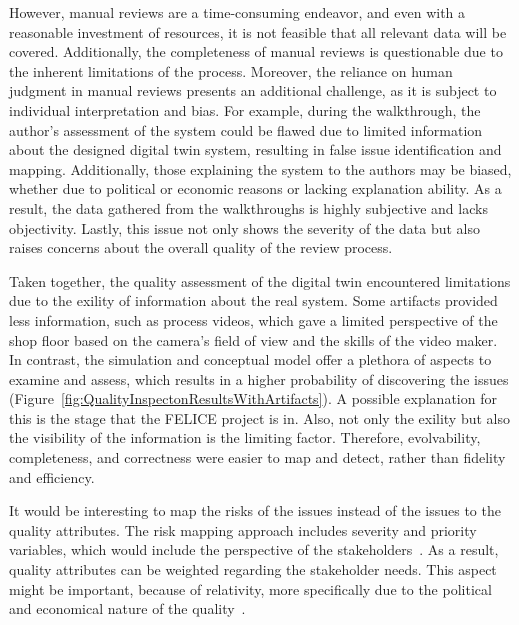 \documentclass{llncs}
\begin{document}
    However, manual reviews are a time-consuming endeavor, and even with a reasonable investment of resources, it is not feasible that all relevant data will be covered. 
    Additionally, the completeness of manual reviews is questionable due to the inherent limitations of the process. 
    Moreover, the reliance on human judgment in manual reviews presents an additional challenge, as it is subject to individual interpretation and bias.  
    For example, during the walkthrough, the author's assessment of the system could be flawed due to limited information about the designed digital twin system, resulting in false 
    issue identification and mapping. Additionally, those explaining the system to the authors may be biased, 
    whether due to political or economic reasons or lacking explanation ability. As a result, the data gathered from the walkthroughs is highly subjective and lacks objectivity. Lastly, this issue not only shows the severity of the data but also raises concerns about 
    the overall quality of the review process.

    Taken together, the quality assessment of the digital twin encountered limitations due to the exility of information about the real system. 
    Some artifacts provided less information, such as process videos, which gave a limited perspective of the shop floor based on the camera's 
    field of view and the skills of the video maker. In contrast, the simulation and conceptual model offer a plethora of aspects to examine and assess, 
    which results in a higher probability of discovering the issues (Figure~\ref{fig:QualityInspectonResultsWithArtifacts}). 
    A possible explanation for this is the stage that the FELICE project is in. Also, not only the exility but also the visibility of the information is the limiting factor. 
    Therefore, evolvability, completeness, and correctness were easier to map and detect, rather than fidelity and efficiency. 

    It would be interesting to map the risks of the issues instead of the issues to the quality attributes. 
    The risk mapping approach includes severity and priority variables, which would include the perspective of the stakeholders~\cite{CemKanerSoftwareTesting,ISO/IEC/IEEE29119}.
    As a result, quality attributes can be weighted regarding the stakeholder needs. This aspect might be important, because of relativity, 
    more specifically due to the political and economical nature of the quality~\cite{SystemQuality}. 
   
    \newpage
    
    

    
\end{document}
